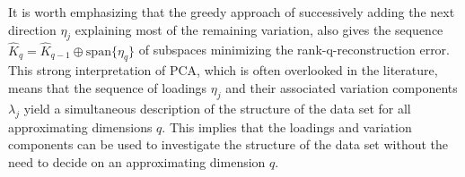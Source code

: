 \documentclass[titlepage,11pt,twoside]{article}
\newcommand{\RR}{\mathbb{R}}
\DeclareMathOperator*{\V}{V}
\newcommand{\argmax}{\text{argmax}}
\begin{document}
It is worth emphasizing that the greedy approach of successively adding the next direction $\eta_j$ explaining most of the remaining variation, also gives the sequence $\hat{K}_q = \hat{K}_{q-1} \oplus \text{span} \{\eta_q\}$ of subspaces minimizing the rank-q-reconstruction error. This strong interpretation of PCA, which is often overlooked in the literature, means that the sequence of loadings $\eta_j$ and their associated variation components $\lambda_j$ yield a simultaneous description of the structure of the data set for all approximating dimensions $q$. This implies that the loadings and variation components can be used to investigate the structure of the data set without the need to decide on an approximating dimension $q$.


\end{document}
